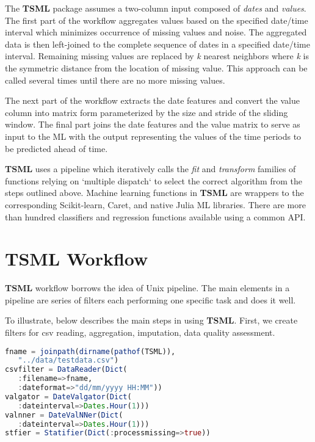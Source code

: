 \documentclass{juliacon}
\begin{document}
The \textbf{TSML} package assumes a two-column input composed of \emph{dates} and \emph{values}. 
The first part of the workflow aggregates values based on the specified date/time 
interval which minimizes occurrence of missing values and noise. The aggregated 
data is then left-joined to the complete sequence of dates in a specified date/time interval. 
Remaining missing values are replaced by \textit{k} nearest neighbors where \textit{k} is the symmetric 
distance from the location of missing value. This approach can be called several 
times until there are no more missing values.

The next part of the workflow extracts the date features and 
convert the value column into matrix form parameterized by 
the size and stride of the sliding window. The final part joins
 the date features and the value matrix to serve as input to the 
 ML with the output representing the values of the time periods 
 to be predicted ahead of time.
 
\textbf{TSML} uses a pipeline which iteratively calls the \emph{fit} and \emph{transform}
families of functions relying on `multiple dispatch` to select the correct 
algorithm from the steps outlined above. Machine learning functions in 
\textbf{TSML} are wrappers to the corresponding Scikit-learn, Caret, and native Julia ML libraries. 
There are more than hundred classifiers and regression functions available using a common API.

\section{TSML Workflow}
\label{sec:tsmlworkflow}
%

\textbf{TSML} workflow borrows the idea of Unix pipeline.
The main elements in a pipeline are series of filters
each performing one specific task and does it well. 

\vskip 6pt
To illustrate, below describes the main steps in using \textbf{TSML}.
First, we create filters for csv reading, aggregation, imputation, data quality
assessment.

\begin{lstlisting}[language = Julia]
fname = joinpath(dirname(pathof(TSML)),
   "../data/testdata.csv")
csvfilter = DataReader(Dict(
   :filename=>fname,
   :dateformat=>"dd/mm/yyyy HH:MM"))
valgator = DateValgator(Dict(
   :dateinterval=>Dates.Hour(1)))
valnner = DateValNNer(Dict(
   :dateinterval=>Dates.Hour(1)))
stfier = Statifier(Dict(:processmissing=>true))
\end{lstlisting}
\end{document}
